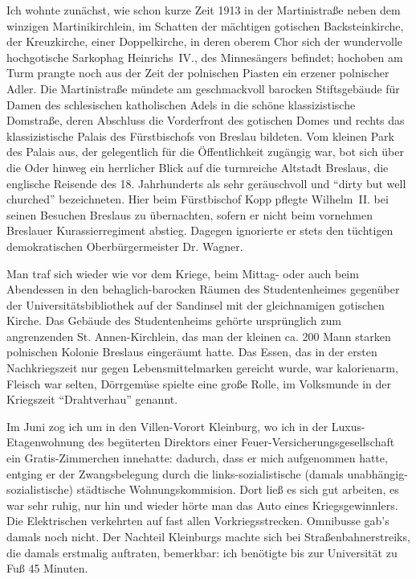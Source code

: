 \documentclass[a5paper,pagesize,10pt,twoside=true]{scrbook}
\begin{document}
Ich wohnte zunächst, wie schon kurze Zeit 1913 in der Martinistraße neben dem winzigen Martinikirchlein, im Schatten der mächtigen gotischen Backsteinkirche, der Kreuzkirche, einer Doppelkirche, in deren oberem Chor sich der wundervolle hochgotische Sarkophag Heinrichs~IV., des Minnesängers befindet; hochoben am Turm prangte noch aus der Zeit der polnischen Piasten ein erzener polnischer Adler. Die Martinistraße mündete am geschmackvoll barocken Stiftsgebäude für Damen des schlesischen katholischen Adels in die schöne klassizistische Domstraße, deren Abschluss die Vorderfront des gotischen Domes und rechts das klassizistische Palais des Fürstbischofs von Breslau bildeten. Vom kleinen Park des Palais aus, der gelegentlich für die Öffentlichkeit zugängig war, bot sich über die Oder hinweg ein herrlicher Blick auf die turmreiche Altstadt Breslaus, die englische Reisende des 18. Jahrhunderts als sehr geräuschvoll und \enquote{dirty but well churched} bezeichneten. Hier beim Fürstbischof Kopp pflegte Wilhelm~II. bei seinen Besuchen Breslaus zu übernachten, sofern er nicht beim vornehmen Breslauer Kurassierregiment abstieg. Dagegen ignorierte er stets den tüchtigen demokratischen Oberbürgermeister Dr. Wagner.

Man traf sich wieder wie vor dem Kriege, beim Mittag- oder auch beim Abendessen in den behaglich-barocken Räumen des Studentenheimes gegenüber der Universitätsbibliothek auf der Sandinsel mit der gleichnamigen gotischen Kirche. Das Gebäude des Studentenheims gehörte ursprünglich zum angrenzenden St. Annen-Kirchlein, das man der kleinen ca. 200 Mann starken polnischen Kolonie Breslaus eingeräumt hatte. Das Essen, das in der ersten Nachkriegszeit nur gegen Lebensmittelmarken gereicht wurde, war kalorienarm, Fleisch war selten, Dörrgemüse spielte eine große Rolle, im Volksmunde in der Kriegszeit \enquote{Drahtverhau} genannt.

Im Juni zog ich um in den Villen-Vorort Kleinburg, wo ich in der Luxus-Etagenwohnung des begüterten Direktors einer Feuer-Versicherungs\-ge\-sell\-schaft ein Gratis-Zimmerchen innehatte: dadurch, dass er mich aufgenommen hatte, entging er der Zwangsbelegung durch die links-sozialistische (damals un\-abh\-ängig-sozialistische) städtische Wohnungskommision. Dort ließ es sich gut arbeiten, es war sehr ruhig, nur hin und wieder hörte man das Auto eines Kriegsgewinnlers. Die Elektrischen verkehrten auf fast allen Vorkriegsstrecken. Omnibusse gab's damals noch nicht. Der Nachteil Kleinburgs machte sich bei Straßenbahnerstreiks, die damals erstmalig auftraten, bemerkbar: ich benötigte bis zur Universität zu Fuß 45 Minuten.
\end{document}
